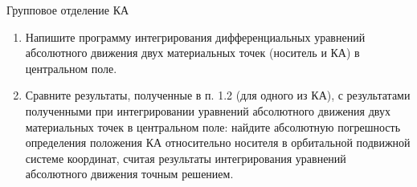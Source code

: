 \documentclass[11pt, compress]{beamer}
\begin{document}
\begin{frame}[fragile]{Групповое отделение КА}
\begin{enumerate} 
 \item[2.1] Напишите программу интегрирования дифференциальных уравнений абсолютного движения двух материальных точек (носитель и КА) в центральном поле. 
 \item[2.2] Сравните результаты, полученные в п. 1.2 (для одного из КА), с результатами полученными при интегрировании уравнений абсолютного движения двух материальных точек в центральном поле: найдите абсолютную погрешность определения положения КА относительно носителя в орбитальной подвижной системе координат, считая результаты интегрирования уравнений абсолютного движения точным решением.
\end{enumerate} 
\end{frame}


  
  
\end{document}
